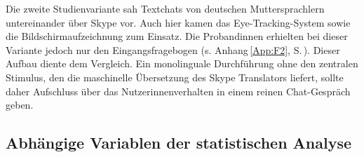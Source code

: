Die zweite Studienvariante sah Textchats von deutschen Muttersprachlern untereinander über Skype vor. Auch hier kamen das Eye-Tracking-System sowie die Bildschirmaufzeichnung zum Einsatz. Die Proband{\textperiodcentered}innen erhielten bei dieser Variante jedoch nur den Eingangsfragebogen (s. Anhang\,\ref{App:F2}, S.\,\pageref{App:F2}). Dieser Aufbau diente dem Vergleich. Ein monolinguale Durchführung ohne den zentralen Stimulus, den die maschinelle Übersetzung des Skype Translators liefert, sollte daher Aufschluss über das Nutzer{\textperiodcentered}innenverhalten in einem reinen Chat-Gespräch geben.



\subsection{Abhängige Variablen der statistischen Analyse}
\label{K5:subsubsec:AbhaengigeVariablenStatAna}

